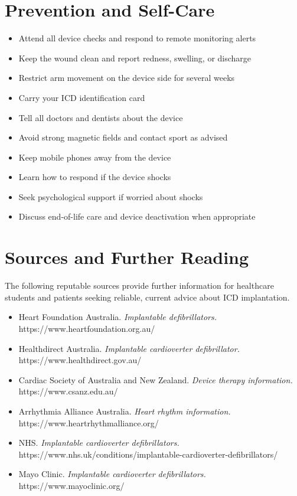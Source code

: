\section*{Prevention and Self-Care}
\begin{itemize}
    \item Attend all device checks and respond to remote monitoring alerts
    \item Keep the wound clean and report redness, swelling, or discharge
    \item Restrict arm movement on the device side for several weeks
    \item Carry your ICD identification card
    \item Tell all doctors and dentists about the device
    \item Avoid strong magnetic fields and contact sport as advised
    \item Keep mobile phones away from the device
    \item Learn how to respond if the device shocks
    \item Seek psychological support if worried about shocks
    \item Discuss end-of-life care and device deactivation when appropriate
\end{itemize}

\section*{Sources and Further Reading}
The following reputable sources provide further information for healthcare students and patients seeking reliable, current advice about ICD implantation.
\begin{itemize}
    \item Heart Foundation Australia. \textit{Implantable defibrillators.} https://www.heartfoundation.org.au/
    \item Healthdirect Australia. \textit{Implantable cardioverter defibrillator.} https://www.healthdirect.gov.au/
    \item Cardiac Society of Australia and New Zealand. \textit{Device therapy information.} https://www.csanz.edu.au/
    \item Arrhythmia Alliance Australia. \textit{Heart rhythm information.} https://www.heartrhythmalliance.org/
    \item NHS. \textit{Implantable cardioverter defibrillators.} https://www.nhs.uk/conditions/implantable-cardioverter-defibrillators/
    \item Mayo Clinic. \textit{Implantable cardioverter defibrillators.} https://www.mayoclinic.org/
\end{itemize}
